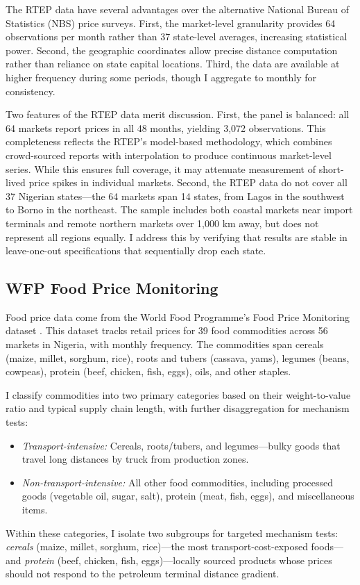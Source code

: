 \documentclass[12pt]{article}
\begin{document}
The RTEP data have several advantages over the alternative National Bureau of Statistics (NBS) price surveys. First, the market-level granularity provides 64 observations per month rather than 37 state-level averages, increasing statistical power. Second, the geographic coordinates allow precise distance computation rather than reliance on state capital locations. Third, the data are available at higher frequency during some periods, though I aggregate to monthly for consistency.

Two features of the RTEP data merit discussion. First, the panel is balanced: all 64 markets report prices in all 48 months, yielding 3,072 observations. This completeness reflects the RTEP's model-based methodology, which combines crowd-sourced reports with interpolation to produce continuous market-level series. While this ensures full coverage, it may attenuate measurement of short-lived price spikes in individual markets. Second, the RTEP data do not cover all 37 Nigerian states---the 64 markets span 14 states, from Lagos in the southwest to Borno in the northeast. The sample includes both coastal markets near import terminals and remote northern markets over 1,000 km away, but does not represent all regions equally. I address this by verifying that results are stable in leave-one-out specifications that sequentially drop each state.

\subsection{WFP Food Price Monitoring}

Food price data come from the World Food Programme's Food Price Monitoring dataset \citep{WFP2024}. This dataset tracks retail prices for 39 food commodities across 56 markets in Nigeria, with monthly frequency. The commodities span cereals (maize, millet, sorghum, rice), roots and tubers (cassava, yams), legumes (beans, cowpeas), protein (beef, chicken, fish, eggs), oils, and other staples.

I classify commodities into two primary categories based on their weight-to-value ratio and typical supply chain length, with further disaggregation for mechanism tests:
\begin{itemize}
    \item \textit{Transport-intensive:} Cereals, roots/tubers, and legumes---bulky goods that travel long distances by truck from production zones.
    \item \textit{Non-transport-intensive:} All other food commodities, including processed goods (vegetable oil, sugar, salt), protein (meat, fish, eggs), and miscellaneous items.
\end{itemize}
Within these categories, I isolate two subgroups for targeted mechanism tests: \textit{cereals} (maize, millet, sorghum, rice)---the most transport-cost-exposed foods---and \textit{protein} (beef, chicken, fish, eggs)---locally sourced products whose prices should not respond to the petroleum terminal distance gradient.
\end{document}
